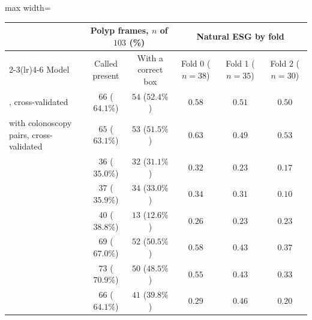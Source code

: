 \begin{table}[!htbp]
\vspace{0.6em}
\begin{adjustbox}{max width=\linewidth}
\begin{tabular}{l cc ccc}
\toprule
 & \multicolumn{2}{c}{Polyp frames, $n$ of $103$ (\%)} & \multicolumn{3}{c}{Natural ESG by fold} \\
\cmidrule(lr){2-3}\cmidrule(lr){4-6}
Model & Called present & With a correct box & Fold 0 ($n = 38$) & Fold 1 ($n = 35$) & Fold 2 ($n = 30$) \\
\midrule
\msn{}, cross-validated & $66$ ($64.1\%$) & $54$ ($52.4\%$) & $0.58$ & $0.51$ & $0.50$ \\
\msp{} with colonoscopy pairs, cross-validated & $65$ ($63.1\%$) & $53$ ($51.5\%$) & $0.63$ & $0.49$ & $0.53$ \\
\ms{} & $36$ ($35.0\%$) & $32$ ($31.1\%$) & $0.32$ & $0.23$ & $0.17$ \\
\msp{} & $37$ ($35.9\%$) & $34$ ($33.0\%$) & $0.34$ & $0.31$ & $0.10$ \\
\base{} & $40$ ($38.8\%$) & $13$ ($12.6\%$) & $0.26$ & $0.23$ & $0.23$ \\
\gem{} & $69$ ($67.0\%$) & $52$ ($50.5\%$) & $0.58$ & $0.43$ & $0.37$ \\
\opus{} & $73$ ($70.9\%$) & $50$ ($48.5\%$) & $0.55$ & $0.43$ & $0.33$ \\
\gpt{} & $66$ ($64.1\%$) & $41$ ($39.8\%$) & $0.29$ & $0.46$ & $0.20$ \\
\bottomrule
\end{tabular}
\end{adjustbox}
\end{table}

